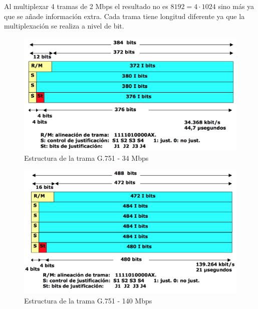 \documentclass[10pt,portrait, twocolumn]{article}
\makeatletter
\renewcommand{\subsubsection}{\@startsection{subsubsection}{3}{0mm}%
                                {-1ex plus -.5ex minus -.2ex}%
                                {1ex plus .2ex}%
                                {\normalfont\small\bfseries}}
\makeatother
\begin{document}
Al multiplexar 4 tramas de 2 Mbps el resultado no es $8192 = 4 \cdot 1024$ sino más ya que se añade información extra. Cada trama tiene longitud diferente ya que la multiplexación se realiza a nivel de bit.
	

	
	\begin{figure}[!ht]
 		\centering
  		 \includegraphics[scale = 0.3]{images/TramaG751}
		\caption{Estructura de la trama G.751 - 34 Mbps}
	\end{figure}
	

	
	\begin{figure}[!ht]
 		\centering
  		 \includegraphics[scale = 0.3]{images/TramaG7512}
		\caption{Estructura de la trama G.751 - 140 Mbps}
	\end{figure}	
\end{document}
